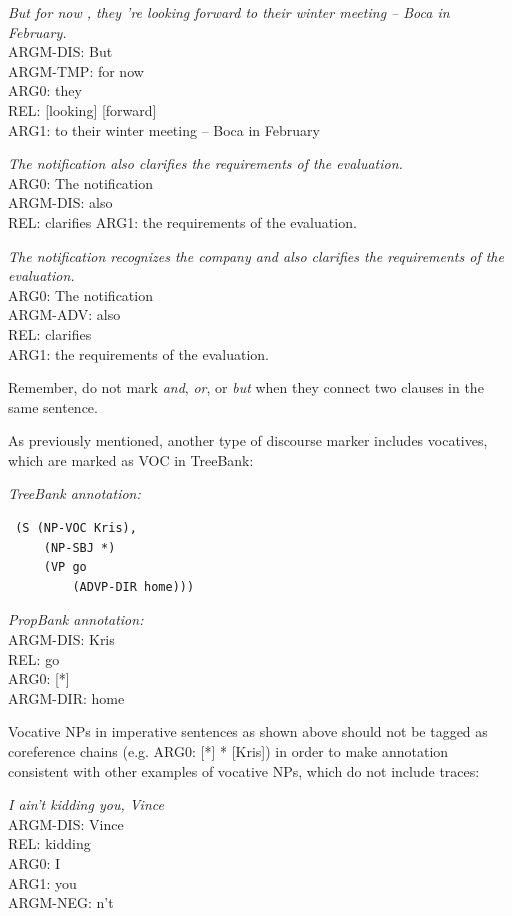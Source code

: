 \documentclass[11pt]{report}
\begin{document}
\textit{But for now , they 're looking forward to their winter meeting -- Boca in February.}\\
ARGM-DIS:        But \\
ARGM-TMP:        for now\\ 
ARG0:        they \\
REL:        [looking] [forward] \\
ARG1:        to their winter meeting -- Boca in February 

\textit{The notification also clarifies the requirements of the evaluation.}\\
ARG0: The notification\\
ARGM-DIS: also\\
REL: clarifies
ARG1: the requirements of the evaluation.

\textit{The notification recognizes the company and also clarifies the requirements of the evaluation.}\\
ARG0: The notification\\
ARGM-ADV: also\\
REL: clarifies\\
ARG1: the requirements of the evaluation.

\noindent Remember, do not mark \textit{and}, \textit{or}, or \textit{but} when they connect two clauses in the same sentence.

\noindent As previously mentioned, another type of discourse marker includes vocatives, which are marked as VOC in TreeBank:

\textit{TreeBank annotation:}
\begin{verbatim}
 (S (NP-VOC Kris),
     (NP-SBJ *)
     (VP go
         (ADVP-DIR home)))
\end{verbatim}

\textit{PropBank annotation:}\\
ARGM-DIS: 	Kris\\
REL:		go\\
ARG0:		[*]\\
ARGM-DIR:	home

Vocative NPs in imperative sentences as shown above should not be tagged as coreference chains  (e.g. ARG0: [*] * [Kris]) in order to make annotation consistent with other examples of vocative NPs, which do not include traces: 

\textit {I ain't kidding you, Vince}\\
ARGM-DIS: 	Vince\\
REL:		kidding\\
ARG0:		I\\
ARG1:		you\\
ARGM-NEG:	n't
\end{document}
